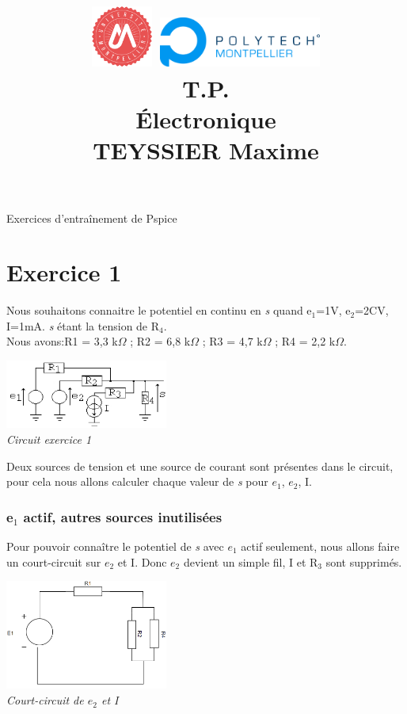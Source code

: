 \documentclass[a4paper,12pt,titlepage]{article}
\title{
    \includegraphics[width=0.15\textwidth]{../logos/UM.png}
    \hspace{1cm}    
    \includegraphics[width=0.4\textwidth]{../logos/Polytech.png}\\
    \vspace{5cm}
    \textbf{T.P.\\Électronique}\\ TEYSSIER Maxime\\
    \vfill
}
\begin{document}
\maketitle
\newpage

\begin{center}
    \Large{Exercices d'entraînement de Pspice}
\end{center}
\section{Exercice 1}

Nous souhaitons connaitre le potentiel en continu en \textit{s} quand e$_1$=1V, e$_2$=2CV, I=1mA.
\textit{s} étant la tension de R$_4$.\\
Nous avons:R1 = 3,3 k$\Omega$ ; R2 = 6,8 k$\Omega$ ; R3 = 4,7 k$\Omega$ ; R4 = 2,2 k$\Omega$.\\

\begin{center}
    \includegraphics[width=0.4\textwidth]{Exo1/Exo1.PNG}\\
    \textit{Circuit exercice 1}\\
\end{center}

Deux sources de tension et une source de courant sont présentes dans le circuit, pour cela nous allons calculer chaque valeur de \textit{s} pour $e_1$, $e_2$, I.

\subsubsection{e$_1$ actif, autres sources inutilisées}

Pour pouvoir connaître le potentiel de \textit{s} avec $e_1$ actif seulement, nous allons faire un court-circuit sur $e_2$ et I.
Donc $e_2$ devient un simple fil, I et R$_3$ sont supprimés. 

\begin{center}
    \includegraphics[width=0.4\textwidth]{Exo1/Exo1-1.PNG}\\
    \textit{Court-circuit de $e_2$ et I}\\
\end{center}
\end{document}
